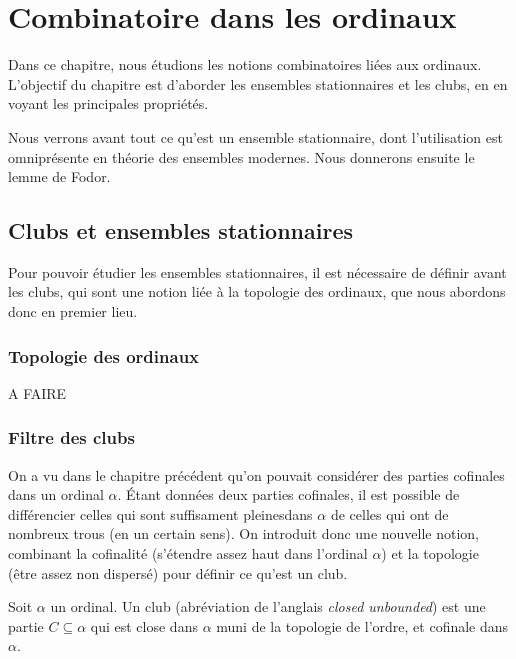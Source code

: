 \chapter{Combinatoire dans les ordinaux}
\label{chp.combi}

\minitoc

Dans ce chapitre, nous étudions les notions combinatoires liées aux ordinaux.
L'objectif du chapitre est d'aborder les ensembles stationnaires et les clubs,
en en voyant les principales propriétés.

Nous verrons avant tout ce qu'est un ensemble stationnaire, dont l'utilisation
est omniprésente en théorie des ensembles modernes. Nous donnerons ensuite le
lemme de Fodor.

\section{Clubs et ensembles stationnaires}

Pour pouvoir étudier les ensembles stationnaires, il est nécessaire de définir
avant les clubs, qui sont une notion liée à la topologie des ordinaux, que nous
abordons donc en premier lieu.

\subsection{Topologie des ordinaux}

A FAIRE

\subsection{Filtre des clubs}

On a vu dans le chapitre précédent qu'on pouvait considérer des parties
cofinales dans un ordinal $\alpha$. \'Etant données deux parties cofinales,
il est possible de différencier celles qui sont \og suffisament pleines\fg dans
$\alpha$ de celles qui ont de nombreux trous (en un certain sens). On introduit
donc une nouvelle notion, combinant la cofinalité (s'étendre assez haut dans
l'ordinal $\alpha$) et la topologie (être assez non dispersé) pour définir ce
qu'est un club.

\begin{definition}[Club]
  Soit $\alpha$ un ordinal. Un club (abréviation de l'anglais
  \emph{closed unbounded}) est une partie $C\subseteq \alpha$ qui est close dans
  $\alpha$ muni de la topologie de l'ordre, et cofinale dans $\alpha$.
\end{definition}

